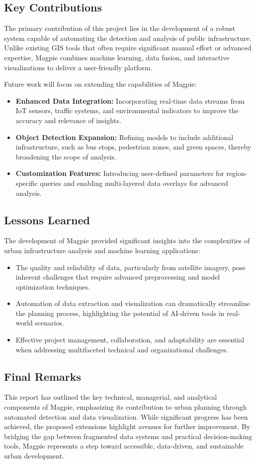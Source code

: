 \documentclass[preview]{standalone}
\begin{document}
\subsection{Key Contributions}
The primary contribution of this project lies in the development of a robust
system capable of automating the detection and analysis of public
infrastructure. Unlike existing GIS tools that often require significant manual
effort or advanced expertise, Magpie combines machine learning, data fusion, and
interactive visualizations to deliver a user-friendly platform.

Future work will focus on extending the capabilities of Magpie:
\begin{itemize}
    \item \textbf{Enhanced Data Integration:} Incorporating real-time data
    streams from IoT sensors, traffic systems, and environmental indicators to
    improve the accuracy and relevance of insights.
    \item \textbf{Object Detection Expansion:} Refining models to include
    additional infrastructure, such as bus stops, pedestrian zones, and green
    spaces, thereby broadening the scope of analysis.
    \item \textbf{Customization Features:} Introducing user-defined parameters
    for region-specific queries and enabling multi-layered data overlays for
    advanced analysis.
\end{itemize}

\subsection{Lessons Learned}
The development of Magpie provided significant insights into the complexities of
urban infrastructure analysis and machine learning applications:
\begin{itemize}
    \item The quality and reliability of data, particularly from satellite
    imagery, pose inherent challenges that require advanced preprocessing and
    model optimization techniques.
    \item Automation of data extraction and visualization can dramatically
    streamline the planning process, highlighting the potential of AI-driven
    tools in real-world scenarios.
    \item Effective project management, collaboration, and adaptability are
    essential when addressing multifaceted technical and organizational
    challenges.
\end{itemize}

\subsection{Final Remarks}
This report has outlined the key technical, managerial, and analytical
components of Magpie, emphasizing its contribution to urban planning through
automated detection and data visualization. While significant progress has been
achieved, the proposed extensions highlight avenues for further improvement. By
bridging the gap between fragmented data systems and practical decision-making
tools, Magpie represents a step toward accessible, data-driven, and sustainable
urban development.

\newpage{}
\end{document}
